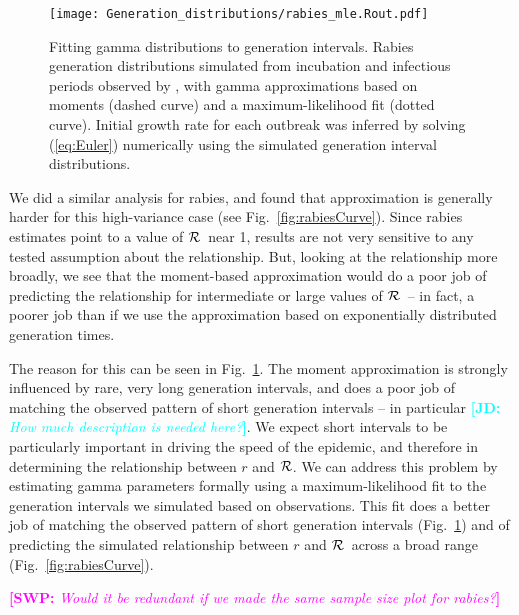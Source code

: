 \documentclass[12pt]{article}
\newcommand{\RR}{\ensuremath{{\cal R}}}
\newcommand{\eref}[1]{(\ref{eq:#1})}
\newcommand{\fref}[1]{Fig.~\ref{fig:#1}}
\newcommand{\comment}[3]{\textcolor{#1}{\textbf{[#2: }\textit{#3}\textbf{]}}}
\newcommand{\jd}[1]{\comment{cyan}{JD}{#1}}
\newcommand{\swp}[1]{\comment{magenta}{SWP}{#1}}
\begin{document}
\begin{figure}[htbp] \centering
	\texttt{[image: Generation\_distributions/rabies\_mle.Rout.pdf]}
	\caption{
		Fitting gamma distributions to generation intervals. 
		Rabies generation distributions simulated from incubation and infectious periods observed by \cite{HampDush09}, with gamma approximations based on moments (dashed curve) and a maximum-likelihood fit (dotted curve). Initial growth rate for each outbreak was inferred by solving \eref{Euler} numerically using the simulated generation interval distributions.
	}
	\label{fig:rabiesHist}
\end{figure}

We did a similar analysis for rabies, and found that approximation is generally harder for this high-variance case (see \fref{rabiesCurve}). Since rabies estimates point to a value of \RR\ near 1, results are not very sensitive to any tested assumption about the relationship. But, looking at the relationship more broadly, we see that the moment-based approximation would do a poor job of predicting the relationship for intermediate or large values of \RR\ -- in fact, a poorer job than if we use the approximation based on exponentially distributed generation times. 

The reason for this can be seen in \fref{rabiesHist}. The moment approximation is strongly influenced by rare, very long generation intervals, and does a poor job of matching the observed pattern of short generation intervals -- in particular \jd{How much description is needed here?}. We expect short intervals to be particularly important in driving the speed of the epidemic, and therefore in determining the relationship between $r$ and \RR. We can address this problem by estimating gamma parameters formally using a maximum-likelihood fit to the generation intervals we simulated based on observations. This fit does a better job of matching the observed pattern of short generation intervals (\fref{rabiesHist}) and of predicting the simulated relationship between $r$ and \RR\ across a broad range (\fref{rabiesCurve}).

\swp{Would it be redundant if we made the same sample size plot for rabies?}
\end{document}
